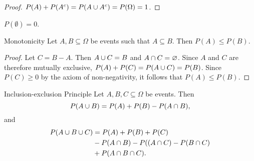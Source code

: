 \begin{proof}
    $P(A) + P(A^{c}) = P(A \cup A^{c}) = P(\Omega) = 1$.
\end{proof}

\begin{cor}
    $P(\emptyset) = 0$.
\end{cor}

\begin{prop}Monotonicity\label{probability-monotonicity}\proofbreak
    Let $A, B \subseteq \Omega$ be events such that $A \subseteq B$. Then $P(A) \leq P(B)$.
\end{prop}

\begin{proof}
    Let $C = B - A$. Then $A \cup C = B$ and $A \cap C = \varnothing$. Since $A$ and $C$ are therefore mutually exclusive, $P(A) + P(C) = P(A \cup C) = P(B)$. Since $P(C) \geq 0$ by the axiom of non-negativity, it follows that $P(A) \leq P(B)$.
\end{proof}

\begin{thm}{Inclusion-exclusion Principle}\label{inclusion-exclusion}
    Let $A, B, C \subseteq \Omega$ be events. Then
    \[P(A \cup B) = P(A) + P(B) - P(A \cap B),\]
    and
    \begin{align*}
        P(A \cup B \cup C) &= P(A) + P(B) + P(C) \\
                               &- P(A \cap B) - P((A \cap C) - P(B \cap C) \\
                               &+ P(A \cap B \cap C).
    \end{align*}
\end{thm}

